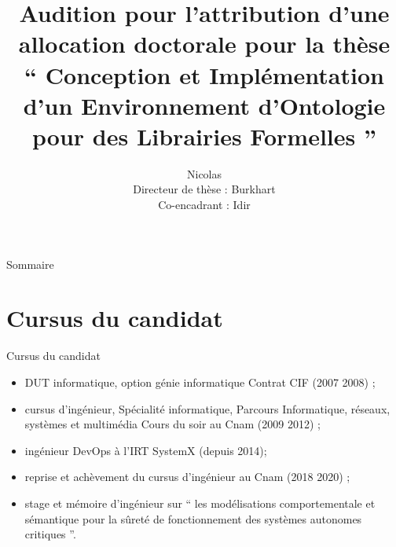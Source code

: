 \documentclass[
  hyperref={
    pdfusetitle,
    pdfencoding=auto,
    psdextra,
    colorlinks=true,
    linkcolor=darkblue,
    citecolor=darkred,
    urlcolor=darkblue,
  },
  9pt,
  aspectratio=169,
]{beamer}
\title{%
  Audition pour l'attribution d'une allocation doctorale pour la thèse%
  \texorpdfstring{\\}{}
  \texorpdfstring{%
  \enquote{%
    Conception et Implémentation d'un Environnement d'Ontologie
    pour des Librairies Formelles%
  }%
  }{%
    Conception et Implémentation d'un Environnement d'Ontologie
    pour des Librairies Formelles%
  }%
}
\author{%
  {\Large Nicolas \texorpdfstring{\bsc{Méric}}{Méric}}%
  \texorpdfstring{\\}{}
  Directeur de thèse : Burkhart \texorpdfstring{\bsc{Wolff}}{Wolff}%
  \texorpdfstring{\\}{}
  Co-encadrant : Idir \texorpdfstring{\bsc{Aït Sadoune}}{Aït Sadoune}%
}
\date{\frenchdate{2020}{06}{11}}
\begin{document}

\begin{frame}
  \titlepage{}
\end{frame}

\begin{frame}{Sommaire}
  \tableofcontents[hideallsubsections]{}
\end{frame}

\section{Cursus du candidat}

\begin{frame}{Cursus du candidat}
  \begin{itemize}
    \item
      DUT informatique, option génie informatique
      \textemdash{} Contrat CIF (2007 \textendash{} 2008) ;
    \item
      cursus d'ingénieur, Spécialité informatique,
      Parcours Informatique, réseaux, systèmes et multimédia
      \textemdash{} Cours du soir au Cnam (2009 \textendash{} 2012) ;
    \item
      ingénieur DevOps à l'\gls{IRT} SystemX (depuis 2014);
    \item
      reprise et achèvement du cursus d'ingénieur au Cnam
      (2018 \textendash{} 2020) ;
    \item
      stage et mémoire d'ingénieur sur
      \enquote{%
        les modélisations comportementale et sémantique pour
        la sûreté de fonctionnement des systèmes autonomes critiques%
      }.
  \end{itemize}
\end{frame}
\end{document}
